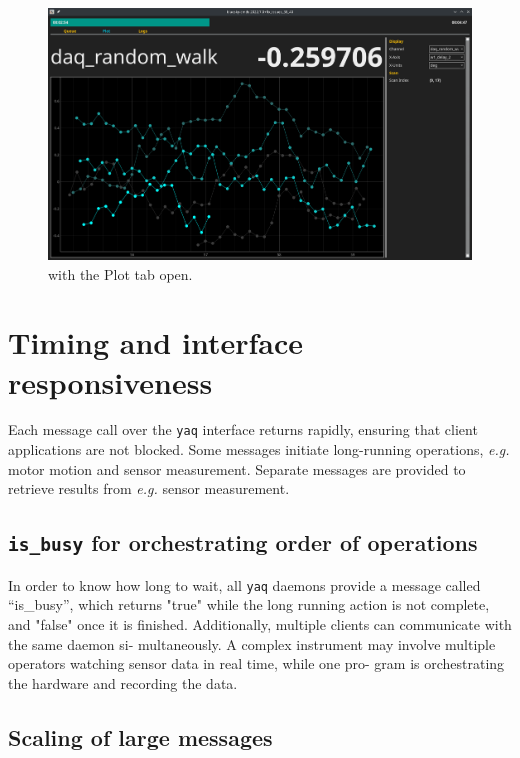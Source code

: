 \documentclass[11pt, full]{article}
\newcommand\yaq{\texttt{yaq}}
\let\stdsection\section
\renewcommand\section{\clearpage\stdsection}
\begin{document}
\clearpage

\begin{landscape}
\begin{figure}
\includegraphics[width=9in]{"figures/plot_tab.png"}
\caption{\blueskycmds with the Plot tab open.}
\label{acq:fig:grid_scan}
\end{figure}
\end{landscape}

\clearpage


\section{Timing and interface responsiveness}

Each message call over the \yaq{} interface returns rapidly, ensuring that client applications are not blocked.
Some messages initiate long-running operations, \emph{e.g.} motor motion and sensor measurement.
Separate messages are provided to retrieve results from \emph{e.g.} sensor measurement.

\subsection{\texttt{is\_busy} for orchestrating order of operations}

In order to know how long to wait, all \yaq{} daemons provide a message called
“is\_busy”, which returns "true" while the long running action
is not complete, and "false" once it is finished. Additionally,
multiple clients can communicate with the same daemon si-
multaneously. A complex instrument may involve multiple
operators watching sensor data in real time, while one pro-
gram is orchestrating the hardware and recording the data.

\subsection{Scaling of large messages}
\end{document}
